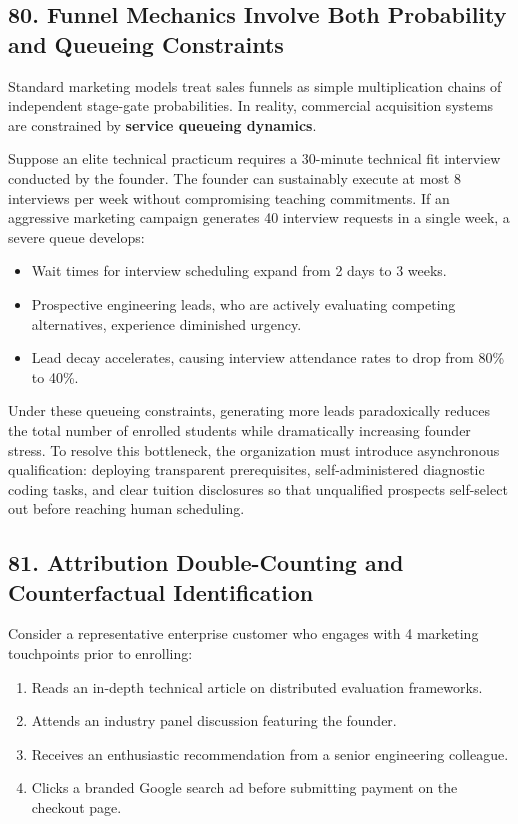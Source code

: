 \subsection*{80. Funnel Mechanics Involve Both Probability and Queueing Constraints}

Standard marketing models treat sales funnels as simple multiplication chains of independent stage-gate probabilities. In reality, commercial acquisition systems are constrained by \textbf{service queueing dynamics}.

Suppose an elite technical practicum requires a 30-minute technical fit interview conducted by the founder. The founder can sustainably execute at most 8 interviews per week without compromising teaching commitments. If an aggressive marketing campaign generates 40 interview requests in a single week, a severe queue develops:
\begin{itemize}[leftmargin=*,itemsep=1pt]
  \item Wait times for interview scheduling expand from 2 days to 3 weeks.
  \item Prospective engineering leads, who are actively evaluating competing alternatives, experience diminished urgency.
  \item Lead decay accelerates, causing interview attendance rates to drop from 80\% to 40\%.
\end{itemize}

Under these queueing constraints, generating more leads paradoxically reduces the total number of enrolled students while dramatically increasing founder stress. To resolve this bottleneck, the organization must introduce asynchronous qualification: deploying transparent prerequisites, self-administered diagnostic coding tasks, and clear tuition disclosures so that unqualified prospects self-select out before reaching human scheduling.

\subsection*{81. Attribution Double-Counting and Counterfactual Identification}

Consider a representative enterprise customer who engages with 4 marketing touchpoints prior to enrolling:
\begin{enumerate}[leftmargin=*,itemsep=1pt]
  \item Reads an in-depth technical article on distributed evaluation frameworks.
  \item Attends an industry panel discussion featuring the founder.
  \item Receives an enthusiastic recommendation from a senior engineering colleague.
  \item Clicks a branded Google search ad before submitting payment on the checkout page.
\end{enumerate}

